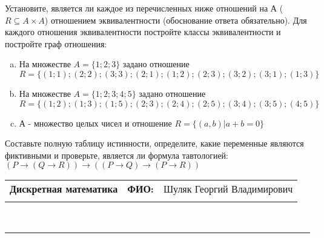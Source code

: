 \documentclass[10pt]{exam}
\newcommand{\class}{Дискретная математика}
\newcommand{\examdate}{}
\begin{document}
\begin{questions}
\question
Установите, является ли каждое из перечисленных ниже отношений на А ($R \subseteq A \times A$) отношением эквивалентности (обоснование ответа обязательно). Для каждого отношения эквивалентности постройте классы 
эквивалентности и постройте граф отношения:
\begin{enumerate} [a)]\setcounter{enumi}{0}
\item На множестве $A = \{1; 2; 3\}$ задано отношение $R = \{(1; 1); (2; 2); (3; 3); (2; 1); (1; 2); (2; 3); (3; 2); (3; 1); (1; 3)\}$
\item На множестве $A = \{1; 2; 3; 4; 5\}$ задано отношение $R = \{(1; 2); (1; 3); (1; 5); (2; 3); (2; 4); (2; 5); (3; 4); (3; 5); (4; 5)\}$
\item А - множество целых чисел и отношение $R = \{(a,b)|a + b = 0\}$
\end{enumerate}\question Составьте полную таблицу истинности, определите, какие переменные являются фиктивными и проверьте, является ли формула тавтологией:
$(P \rightarrow (Q \rightarrow R)) \rightarrow ((P \rightarrow Q) \rightarrow (P \rightarrow R))$

\end{questions}
\newpage
\begin{flushright}
\begin{tabular}{p{2.8in} r l}
\textbf{\class} & \textbf{ФИО:} &Шуляк Георгий Владимирович
\\

\textbf{\examdate} &&\\
\end{tabular}\\
\end{flushright}
\rule[1ex]{\textwidth}{.1pt}
\end{document}
